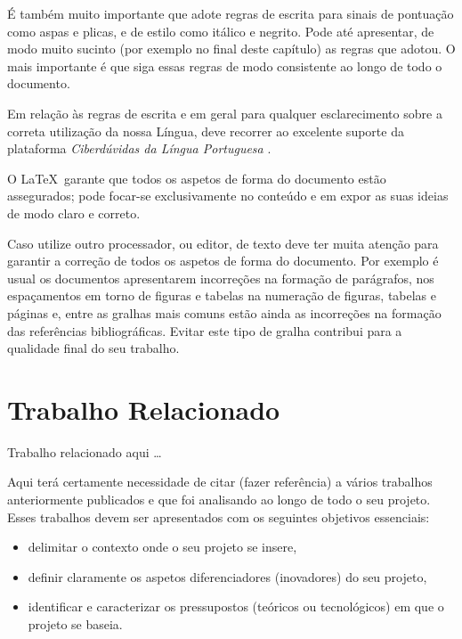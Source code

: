 É também muito importante que adote regras de escrita para sinais de pontuação como aspas e plicas, e de estilo como itálico e negrito. Pode até apresentar, de modo muito sucinto (por exemplo no final deste capítulo) as regras que adotou. O mais importante é que siga essas regras de modo consistente ao longo de todo o documento.

Em relação às regras de escrita e em geral para qualquer esclarecimento sobre a correta utilização da nossa Língua, deve recorrer ao excelente suporte da plataforma \textit{Ciberdúvidas da Língua Portuguesa} \cite{ciberduvidas}.

O \LaTeX\ garante que todos os aspetos de forma do documento estão assegurados; pode focar-se exclusivamente no conteúdo e em expor as suas ideias de modo claro e correto.

Caso utilize outro processador, ou editor, de texto deve ter muita atenção para garantir a correção de todos os aspetos de forma do documento. Por exemplo é usual os documentos apresentarem incorreções na formação de parágrafos, nos espaçamentos em torno de figuras e tabelas na numeração de figuras, tabelas e páginas e, entre as gralhas mais comuns estão ainda as incorreções na formação das referências bibliográficas. Evitar este tipo de gralha contribui para a qualidade final do seu trabalho.







\chapter{Trabalho Relacionado}
\label{ch:trabalhoRelacionado}

Trabalho relacionado aqui \ldots

Aqui terá certamente necessidade de citar (fazer referência) a vários trabalhos anteriormente publicados e que foi analisando ao longo de todo o seu projeto. Esses trabalhos devem ser apresentados com os seguintes objetivos essenciais:
\begin{itemize}
\item
delimitar o contexto onde o seu projeto se insere,

\item
definir claramente os aspetos diferenciadores (inovadores) do seu projeto,

\item
identificar e caracterizar os pressupostos (teóricos ou tecnológicos) em que o projeto se baseia.
\end{itemize}

